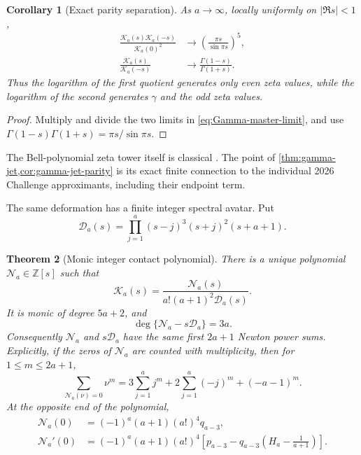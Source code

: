 \documentclass[11pt]{article}
\theoremstyle{keio}
\newtheorem{theorem}{Theorem}[section]
\newtheorem{corollary}[theorem]{Corollary}
\theoremstyle{definition}
\theoremstyle{remark}
\newcommand{\Z}{\mathbb Z}
\begin{document}
\begin{corollary}[Exact parity separation]
\label{cor:gamma-jet-parity}
As \(a\to\infty\), locally uniformly on \(|\Re s|<1\),
\begin{align}
 \frac{\mathscr K_a(s)\mathscr K_a(-s)}{\mathscr K_a(0)^2}
 &\longrightarrow
 \left(\frac{\pi s}{\sin\pi s}\right)^5,
 \label{eq:even-jet-limit}\\
 \frac{\mathscr K_a(s)}{\mathscr K_a(-s)}
 &\longrightarrow\frac{\Gamma(1-s)}{\Gamma(1+s)}.
 \label{eq:odd-jet-limit}
\end{align}
Thus the logarithm of the first quotient generates only even zeta values,
while the logarithm of the second generates \(\gamma\) and the odd zeta
values.
\end{corollary}

\begin{proof}
Multiply and divide the two limits in \eqref{eq:Gamma-master-limit}, and use
\(\Gamma(1-s)\Gamma(1+s)=\pi s/\sin\pi s\).
\end{proof}

The Bell-polynomial zeta tower itself is classical
\cite{PilehroodBell2012}.  The point of
\cref{thm:gamma-jet,cor:gamma-jet-parity} is its exact finite connection to
the individual 2026 Challenge approximants, including their endpoint term.

The same deformation has a finite integer spectral avatar.  Put
\begin{equation}\label{eq:contact-denominator}
 \mathscr D_a(s)=
 \prod_{j=1}^a(s-j)^3(s+j)^2(s+a+1).
\end{equation}

\begin{theorem}[Monic integer contact polynomial]
\label{thm:contact-polynomial}
There is a unique polynomial \(\mathscr N_a\in\Z[s]\) such that
\begin{equation}\label{eq:contact-rational-form}
 \mathscr K_a(s)=
 \frac{\mathscr N_a(s)}{a!(a+1)^2\mathscr D_a(s)}.
\end{equation}
It is monic of degree \(5a+2\), and
\begin{equation}\label{eq:contact-degree}
 \deg\{\mathscr N_a-s\mathscr D_a\}=3a.
\end{equation}
Consequently \(\mathscr N_a\) and \(s\mathscr D_a\) have the same first
\(2a+1\) Newton power sums.  Explicitly, if the zeros of
\(\mathscr N_a\) are counted with multiplicity, then for
\(1\le m\le2a+1\),
\begin{equation}\label{eq:contact-Newton}
 \sum_{\mathscr N_a(\nu)=0}\nu^m
 =3\sum_{j=1}^aj^m+2\sum_{j=1}^a(-j)^m+(-a-1)^m.
\end{equation}
At the opposite end of the polynomial,
\begin{align}
 \mathscr N_a(0)
 &=(-1)^a(a+1)(a!)^4q_{a-3},
 \label{eq:contact-N0}\\
 \mathscr N_a'(0)
 &=(-1)^a(a+1)(a!)^4
 \left[p_{a-3}-q_{a-3}\left(H_a-\frac1{a+1}\right)\right].
 \label{eq:contact-N1}
\end{align}
\end{theorem}
\end{document}
